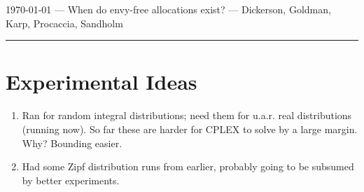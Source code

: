 \documentclass[9pt]{article}
\begin{document}
\today{} --- When do envy-free allocations exist? --- Dickerson, Goldman, Karp, Procaccia, Sandholm

\rule{0.33\linewidth}{2pt}


\section{Experimental Ideas}
\begin{enumerate}
\item Ran for random integral distributions; need them for u.a.r. real distributions (running now).  So far these are harder for CPLEX to solve by a large margin.  Why?  Bounding easier.
\item Had some Zipf distribution runs from earlier, probably going to be subsumed by better experiments.
\end{enumerate}
\end{document}
